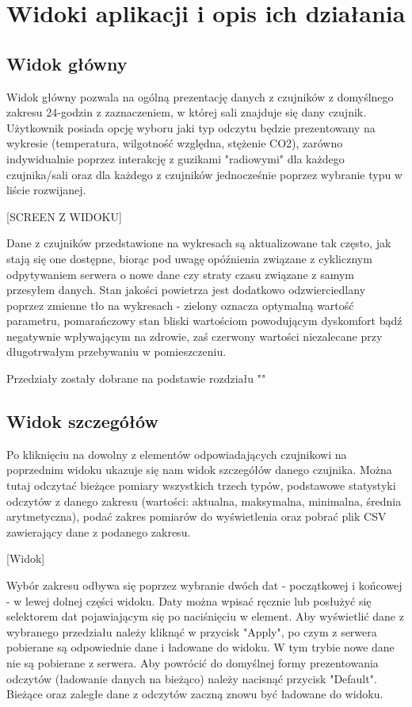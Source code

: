 \section{Widoki aplikacji i opis ich działania}

\subsection{Widok główny}
Widok główny pozwala na ogólną prezentację danych z czujników z domyślnego zakresu 24-godzin z zaznaczeniem, w której sali znajduje się dany czujnik. 
Użytkownik posiada opcję wyboru jaki typ odczytu będzie prezentowany na wykresie (temperatura, wilgotność względna, stężenie CO2), zarówno indywidualnie 
poprzez interakcję z guzikami "radiowymi" dla każdego czujnika/sali oraz dla każdego z czujników jednocześnie poprzez wybranie typu
w liście rozwijanej. 

[SCREEN Z WIDOKU]

Dane z czujników przedstawione na wykresach są aktualizowane tak często, jak stają się one dostępne, biorąc pod uwagę opóźnienia związane
z cyklicznym odpytywaniem serwera o nowe dane czy straty czasu związane z samym przesyłem danych. Stan jakości powietrza jest dodatkowo
odzwierciedlany poprzez zmienne tło na wykresach - zielony oznacza optymalną wartość parametru, pomarańczowy stan bliski wartościom powodującym
dyskomfort bądź negatywnie wpływającym na zdrowie, zaś czerwony wartości niezalecane przy długotrwałym przebywaniu w pomieszczeniu.

Przedziały zostały dobrane na podstawie rozdziału ""

\subsection{Widok szczegółów}

Po kliknięciu na dowolny z elementów odpowiadających czujnikowi na poprzednim widoku ukazuje się nam widok szczegółów danego czujnika. Można tutaj odczytać
bieżące pomiary wszystkich trzech typów, podstawowe statystyki odczytów z danego zakresu (wartości: aktualna, maksymalna, minimalna, średnia arytmetyczna), 
podać zakres pomiarów do wyświetlenia oraz pobrać plik CSV zawierający dane z podanego zakresu.

[Widok]

Wybór zakresu odbywa się poprzez wybranie dwóch dat - początkowej i końcowej - w lewej dolnej części widoku. Daty można wpisać ręcznie lub posłużyć się
selektorem dat pojawiającym się po naciśnięciu w element. Aby wyświetlić dane z wybranego przedziału należy kliknąć w przycisk "Apply", po czym z serwera pobierane
są odpowiednie dane i ładowane do widoku. W tym trybie nowe dane nie są pobierane z serwera. 
Aby powrócić do domyślnej formy prezentowania odczytów (ładowanie danych na bieżąco) należy nacisnąć przycisk "Default". Bieżące oraz zaległe dane z odczytów
zaczną znowu być ładowane do widoku.


